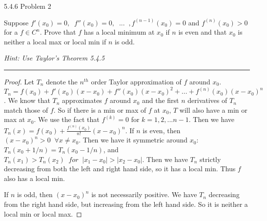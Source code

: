 \documentclass[11pt]{article}
\renewcommand{\sp}{\; \;}
\begin{document}
 5.4.6 Problem 2

Suppose $f'(x_0) = 0, \sp f''(x_0) = 0, \sp ... \sp, f^{(n-1)}(x_0) = 0$ and $f^{(n)} (x_0) > 0$ for a $f \in C^n$. Prove that $f$ has a local minimum at $x_0$ if $n$ is even and that $x_0$ is neither a local max or local min if $n$ is odd. 

\textit{Hint: Use Taylor's Theorem 5.4.5}
\hrule 


\begin{proof}

Let $T_n$ denote the $n^{th}$ order Taylor approximation of $f$ around $x_0$. 
$T_n = f(x_0) + f'(x_0) (x - x_0) + f''(x_0) (x - x_0)^2 + ... + f^{(n)}(x_0) (x - x_0)^n$. We know that $T_n$ approximates $f$ around $x_0$ and the first $n$ derivatives of $T_n$ match those of $f$. 
So if there is a min or max of $f$ at $x_0$, $T$ will also have a min or max at $x_0$. We use the fact that $f^{(k)} = 0$ for $k = 1, 2, ... n-1$. 
Then we have $T_n(x) = f(x_0) + \frac{f^{(n)}(x_0)}{n!} (x - x_0)^n$. 
If $n$ is even, then $(x - x_0)^n > 0 \sp \forall x \neq x_0$. 
Then we have it symmetric around $x_0$: $T_n(x_0 + 1/n) = T_n(x_0 - 1/n)$, and $T_n(x_1) > T_n(x_2) \sp for \sp |x_1 - x_0| > |x_2 - x_0|$. 
Then we have $T_n$ strictly decreasing from both the left and right hand side, so it has a local min. Thus $f$ also has a local min.

If $n$ is odd, then $(x - x_0)^n$ is not necessarily positive. We have $T_n$ decreasing from the right hand side, but increasing from the left hand side. So it is neither a local min or local max.


\end{proof}
\end{document}
